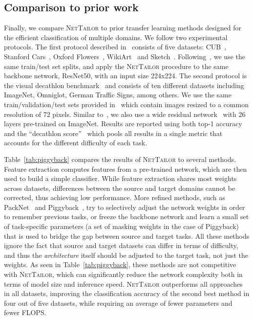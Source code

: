 \documentclass[10pt,twocolumn,letterpaper]{article}
\begin{document}
\subsection{Comparison to prior work}
\vspace{-3pt}
\label{sec:sota}
Finally, we compare \textsc{NetTailor} to prior transfer learning methods designed for the efficient classification of multiple domains.
We follow two experimental protocols. The first protocol described in~\cite{mallya2018piggyback} consists of five datasets: CUB~\cite{cub}, Stanford Cars~\cite{cars}, Oxford Flowers~\cite{flowers}, WikiArt~\cite{wikiart} and Sketch~\cite{sketch}. Following~\cite{mallya2018piggyback}, we use the same train/test set splits, and apply the \textsc{NetTailor} procedure to the same backbone network, ResNet50, with an input size 224x224. 
The second protocol is the visual decathlon benchmark~\cite{rebuffi2017learning} and consists of ten different datasets including ImageNet, Omniglot, German Traffic Signs, among others.
We use the same train/validation/test sets provided in~\cite{rebuffi2017learning} which contain images resized to a common resolution of 72 pixels.
Similar to~\cite{rebuffi2018efficient}, we also use a wide residual network~\cite{zagoruyko2016wide} with 26 layers pre-trained on ImageNet.
Results are reported using both top-1 accuracy and the ``decathlon score''~\cite{rebuffi2017learning} which pools all results in a single metric that accounts for the different difficulty of each task.

Table~\ref{tab:piggyback} compares the results of \textsc{NetTailor} to several methods. Feature extraction computes features from a pre-trained network, which are then used to build a simple classifier. While feature extraction shares most weights across datasets, differences between the source and target domains cannot be corrected, thus achieving low performance. 
More refined methods, such as PackNet~\cite{mallya2017packnet} and Piggyback~\cite{mallya2018piggyback}, try to selectively adjust the network weights in order to remember previous tasks, or freeze the backbone network and learn a small set of task-specific parameters (a set of masking weights in the case of Piggyback) that is used to bridge the gap between source and target tasks.
All these methods ignore the fact that source and target datasets can differ in terms of difficulty, and thus the \textit{architecture} itself should be adjusted to the target task, not just the weights. 
As seen in Table~\ref{tab:piggyback}, these methods are not competitive with \textsc{NetTailor}, which can significantly reduce the network complexity both in terms of model size and inference speed. 
\textsc{NetTailor} outperforms all approaches in all datasets, improving the classification accuracy of the second best method in four out of five datasets, while requiring an average of  fewer parameters and  fewer FLOPS.
\end{document}
